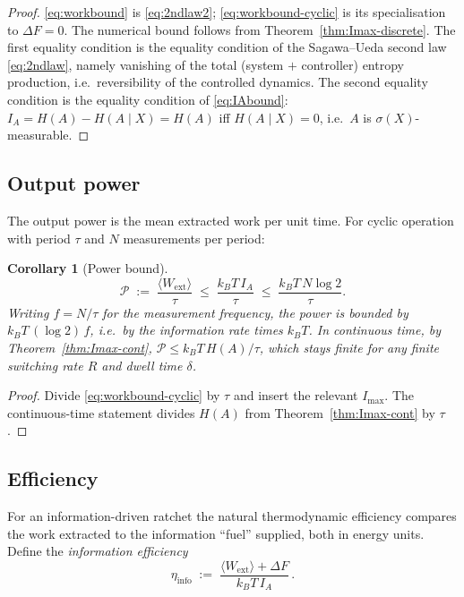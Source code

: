 \documentclass{amsart}
\newtheorem{corollary}{Corollary}
\theoremstyle{definition}
\newcommand{\kB}{k_{B}}
\newcommand{\Wext}{\langle W_{\mathrm{ext}}\rangle}
\begin{document}
\begin{proof}
\eqref{eq:workbound} is \eqref{eq:2ndlaw2}; \eqref{eq:workbound-cyclic} is its
specialisation to $\Delta F=0$. The numerical bound follows from
Theorem~\ref{thm:Imax-discrete}. The first equality condition is the
equality condition of the Sagawa--Ueda second law \eqref{eq:2ndlaw}, namely
vanishing of the total (system $+$ controller) entropy production, i.e.\
reversibility of the controlled dynamics. The second equality condition is the
equality condition of \eqref{eq:IAbound}: $I_A=H(A)-H(A\mid X)=H(A)$ iff
$H(A\mid X)=0$, i.e.\ $A$ is $\sigma(X)$-measurable.
\end{proof}

\subsection{Output power}

The output power is the mean extracted work per unit time. For cyclic
operation with period $\tau$ and $N$ measurements per period:

\begin{corollary}[Power bound]\label{cor:power}
\begin{equation}\label{eq:power}
\mathcal P \;:=\; \frac{\Wext}{\tau}\;\le\;\frac{\kB T\,I_A}{\tau}
\;\le\;\frac{\kB T\,N\log2}{\tau}.
\end{equation}
Writing $f=N/\tau$ for the measurement frequency, the power is bounded by
$\kB T\,(\log2)\,f$, i.e.\ by the information \emph{rate} times $\kB T$. In
continuous time, by Theorem~\ref{thm:Imax-cont},
$\mathcal P\le \kB T\,H(A)/\tau$, which stays finite for any finite switching
rate $R$ and dwell time $\delta$.
\end{corollary}

\begin{proof}
Divide \eqref{eq:workbound-cyclic} by $\tau$ and insert the relevant
$I_{\max}$. The continuous-time statement divides $H(A)$ from
Theorem~\ref{thm:Imax-cont} by $\tau$.
\end{proof}

\subsection{Efficiency}

For an information-driven ratchet the natural thermodynamic efficiency
compares the work extracted to the information ``fuel'' supplied, both in
energy units. Define the \emph{information efficiency}
\begin{equation}\label{eq:eta-def}
\eta_{\mathrm{info}} \;:=\; \frac{\Wext + \Delta F}{\kB T\, I_A}\, .
\end{equation}
\end{document}
